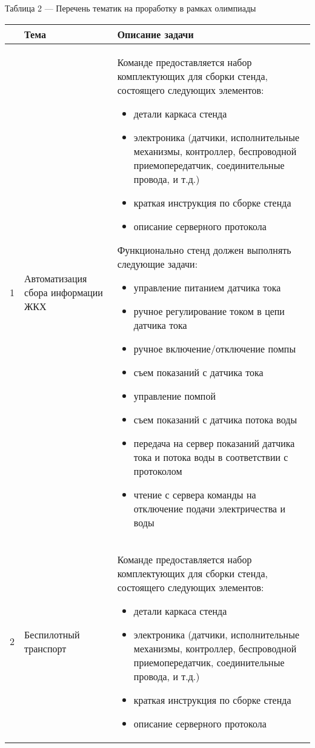 \begin{table}[H]
    Таблица 2 — Перечень тематик на проработку в рамках олимпиады
    \begin{tabular}{|c|p{6cm}|p{8cm}|}
        \hline
        & Тема & Описание задачи \\
        \hline
        1 & Автоматизация сбора информации ЖКХ & 

        Команде предоставляется набор комплектующих для сборки стенда, состоящего следующих элементов:
        \begin{itemize}
            \item детали каркаса стенда
            \item электроника (датчики, исполнительные механизмы, контроллер, беспроводной приемопередатчик, соединительные провода, и т.д.)
            \item краткая инструкция по сборке стенда
            \item описание серверного протокола        
        \end{itemize}
        
        Функционально стенд должен выполнять следующие задачи:
        
        \begin{itemize}
            \item управление питанием датчика тока
            \item ручное регулирование током в цепи датчика тока
            \item ручное включение/отключение помпы
            \item съем показаний с датчика тока
            \item управление помпой
            \item съем показаний с датчика потока воды
            \item передача на сервер показаний датчика тока и потока воды в соответствии с протоколом
            \item чтение с сервера команды на отключение подачи электричества и воды
        \end{itemize} \\
        \hline

        2 & Беспилотный транспорт & 
        
        Команде предоставляется набор комплектующих для сборки стенда, состоящего следующих элементов: 

        \begin{itemize}
            \item детали каркаса стенда
            \item электроника (датчики, исполнительные механизмы, контроллер, беспроводной приемопередатчик, соединительные провода, и т.д.)
            \item краткая инструкция по сборке стенда
            \item описание серверного протокола                
        \end{itemize}
        

\end{tabular}
\end{table}
